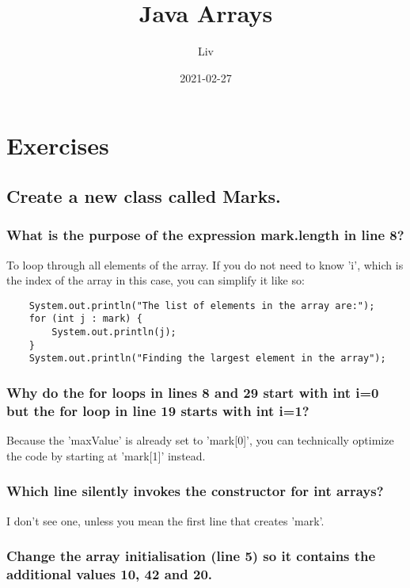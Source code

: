 \documentclass{article}
\title{Java Arrays}
\date{2021-02-27}
\author{Liv}
\begin{document}
    \maketitle

    \section{Exercises}

    \subsection{Create a new class called Marks.}
    \subsubsection{What is the purpose of the expression mark.length in line 8?}

    To loop through all elements of the array. If you do not need to know 'i', which is the index of the array in this case, you can simplify it like so:

    \begin{verbatim}
    System.out.println("The list of elements in the array are:");
    for (int j : mark) {
        System.out.println(j);
    }
    System.out.println("Finding the largest element in the array");
    \end{verbatim}

    \subsubsection{Why do the for loops in lines 8 and 29 start with int i=0 but the for loop in line 19 starts with int i=1?}

    Because the 'maxValue' is already set to 'mark[0]', you can technically optimize the code by starting at 'mark[1]' instead.

    \subsubsection{Which line silently invokes the constructor for int arrays?}

    I don't see one, unless you mean the first line that creates 'mark'.

    \subsubsection{Change the array initialisation (line 5) so it contains the additional values 10, 42 and 20.}
\end{document}
